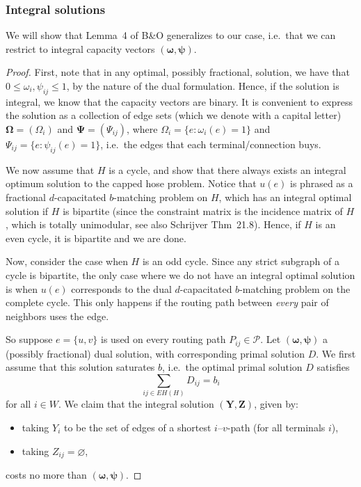 \documentclass[11pt]{article}
\begin{document}
    \subsubsection*{Integral solutions}
    We will show that Lemma~4 of B\&O generalizes to our case, i.e.\ that we can restrict to integral capacity vectors $(\boldsymbol \omega, \boldsymbol \psi)$.
    \begin{proof}
        First, note that in any optimal, possibly fractional, solution, we have that $0 \le \omega_i, \psi_{ij} \le 1$, by the nature of the dual formulation.
        Hence, if the solution is integral, we know that the capacity vectors are binary.
        It is convenient to express the solution as a collection of edge sets (which we denote with a capital letter) $\boldsymbol \Omega = (\Omega_i)$ and $\boldsymbol \Psi = (\Psi_{ij})$, where $\Omega_i = \{ e : \omega_i(e) = 1 \}$ and $\Psi_{ij} = \{ e : \psi_{ij}(e) = 1 \}$, i.e.\ the edges that each terminal/connection buys.

        We now assume that $H$ is a cycle, and show that there always exists an integral optimum solution to the capped hose problem.
        Notice that $u(e)$ is phrased as a fractional $d$-capacitated $b$-matching problem on $H$, which has an integral optimal solution if $H$ is bipartite (since the constraint matrix is the incidence matrix of $H$, which is totally unimodular, see also Schrijver Thm~21.8).
        Hence, if $H$ is an even cycle, it is bipartite and we are done.

        Now, consider the case when $H$ is an odd cycle.
        Since any strict subgraph of a cycle is bipartite, the only case where we do not have an integral optimal solution is when $u(e)$ corresponds to the dual $d$-capacitated $b$-matching problem on the complete cycle.
        This only happens if the routing path between \emph{every} pair of neighbors uses the edge.

        So suppose $e = \{u, v\}$ is used on every routing path $P_{ij} \in \mathcal P$.
        Let $(\boldsymbol \omega, \boldsymbol \psi)$ a (possibly fractional) dual solution, with corresponding primal solution $D$.
        We first assume that this solution saturates $b$, i.e.\ the optimal primal solution $D$ satisfies
        \[
            \sum_{ij \in EH(H)} D_{ij} = b_i
        \]
        for all $i \in W$.
        We claim that the integral solution $(\boldsymbol Y, \boldsymbol Z)$, given by:
        \begin{itemize}
            \item taking $Y_i$ to be the set of edges of a shortest $i$--$v$-path (for all terminals $i$),
            \item taking $Z_{ij} = \varnothing$,
        \end{itemize}
        costs no more than $(\boldsymbol \omega, \boldsymbol \psi)$.


\end{proof}
\end{document}
